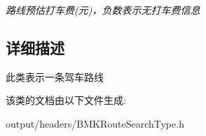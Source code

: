 \begin{DoxyCompactItemize}
\begin{DoxyCompactList}\small\item\em 路线预估打车费(元)，负数表示无打车费信息 \end{DoxyCompactList}\end{DoxyCompactItemize}


\subsection{详细描述}
此类表示一条驾车路线 

该类的文档由以下文件生成\+:\begin{DoxyCompactItemize}
\item 
output/headers/B\+M\+K\+Route\+Search\+Type.\+h\end{DoxyCompactItemize}
